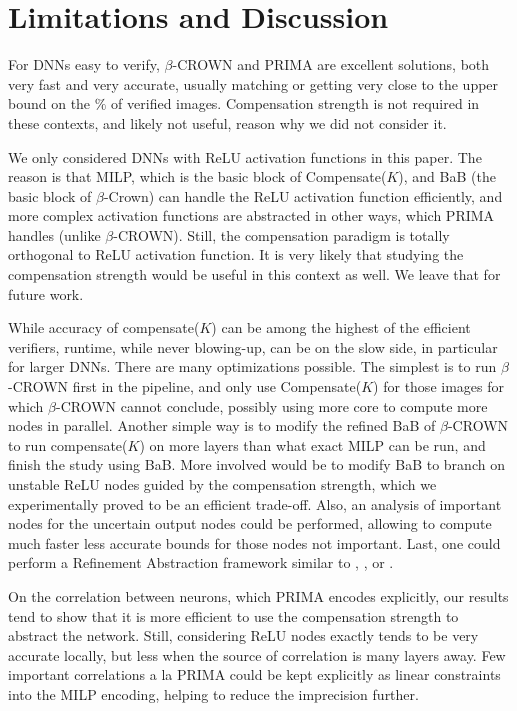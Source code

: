 \documentclass{llncs}
\begin{document}
\section{Limitations and Discussion}

For DNNs easy to verify, $\beta$-CROWN and PRIMA are excellent solutions, both very fast and very accurate, usually matching or getting very close to the upper bound on the $\%$ of verified images. Compensation strength is not required in these contexts, and likely not useful, reason why we did not consider it.

We only considered DNNs with ReLU activation functions in this paper. The reason is that MILP, which is the basic block of Compensate($K$), and BaB (the basic block of $\beta$-Crown) can handle the ReLU activation function efficiently, and more complex activation functions are abstracted in other ways, which PRIMA handles (unlike $\beta$-CROWN). Still, the compensation paradigm is totally orthogonal to ReLU activation function. It is very likely that studying the compensation strength would be useful in this  context as well. We leave that for future work. 

While accuracy of compensate($K$) can be among the highest of the efficient verifiers, runtime, while never blowing-up, can be on the slow side, in particular for larger DNNs. There are many optimizations possible. The simplest is to run $\beta$-CROWN first in the pipeline, and only use Compensate($K$) for those images for which $\beta$-CROWN cannot conclude, possibly using more core to compute more nodes in parallel. Another simple way is to modify the refined BaB of $\beta$-CROWN to run compensate($K$) on more layers than what exact MILP can be run, and finish the study using BaB. More involved would be to modify BaB to branch on unstable ReLU nodes guided by the compensation strength, which we experimentally proved to be an efficient trade-off. Also, an analysis of important nodes for the uncertain output nodes could be performed, allowing to compute much faster less accurate bounds for those nodes not important. Last, one could perform a Refinement Abstraction framework similar to \cite{atva}, \cite{elboher}, or \cite{SRGR}.

On the correlation between neurons, which PRIMA encodes explicitly, our results tend to show that it is more efficient to use the compensation strength to abstract the network. Still, considering ReLU nodes exactly tends to be very accurate locally, but less when the source of correlation is many layers away. Few important correlations a la PRIMA could be kept explicitly as linear constraints into the MILP encoding, helping to reduce the imprecision further.
\end{document}
